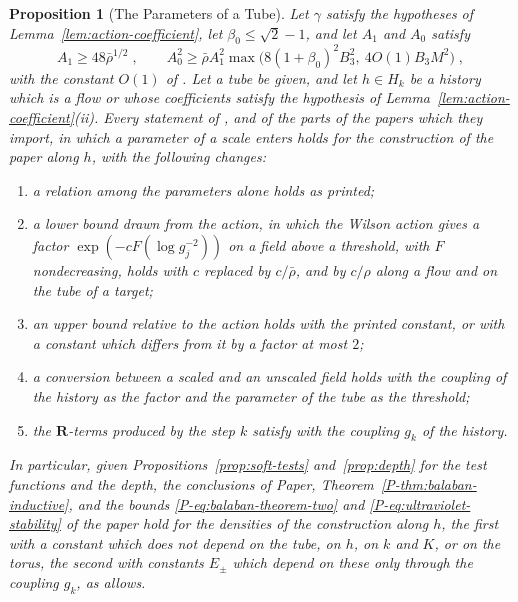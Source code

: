 \documentclass[11pt]{preprint}
\numberwithin{equation}{section}
\newtheorem{proposition}{Proposition}
\theoremstyle{definition}
\theoremstyle{remark}
\theoremstyle{plain}
\begin{document}
\begin{proposition}[The Parameters of a Tube]\label{prop:parameters}
Let $\gamma$ satisfy the hypotheses of Lemma~\ref{lem:action-coefficient}, let $\beta_0 \leq \sqrt2 - 1$, and let $A_1$ and $A_0$ satisfy
\begin{equation}\label{eq:threshold-constants}
    A_1 \geq 48\bar\rho^{1/2}\;,
    \qquad
    A_0^2 \geq \bar\rho A_1^2\max\bigl(8(1 + \beta_0)^2B_3^2,\ 4O(1)B_3M^2\bigr)\;,
\end{equation}
with the constant $O(1)$ of \cite[p.~381]{BalabanLFR2}. Let a tube be given, and let $h \in H_k$ be a history which is a flow or whose coefficients satisfy the hypothesis of Lemma~\ref{lem:action-coefficient}(ii). Every statement of \cite{BalabanCRE,BalabanLFR1,BalabanLFR2}, and of the parts of the papers which they import, in which a parameter of a scale enters holds for the construction of the paper along $h$, with the following changes:
\begin{enumerate}[label=(\alph*)]
\item a relation among the parameters alone holds as printed;
\item a lower bound drawn from the action, in which the Wilson action gives a factor $\exp(-cF(\log g_j^{-2}))$ on a field above a threshold, with $F$ nondecreasing, holds with $c$ replaced by $c/\bar\rho$, and by $c/\rho$ along a flow and on the tube of a target;
\item an upper bound relative to the action holds with the printed constant, or with a constant which differs from it by a factor at most $2$;
\item a conversion between a scaled and an unscaled field holds with the coupling of the history as the factor and the parameter of the tube as the threshold;
\item the $\mathbf R$-terms produced by the step $k$ satisfy \cite[(2.31), p.~260]{BalabanCRE} with the coupling $g_k$ of the history.
\end{enumerate}
In particular, given Propositions~\ref{prop:soft-tests} and~\ref{prop:depth} for the test functions and the depth, the conclusions of Paper, Theorem~\ref{P-thm:balaban-inductive}, and the bounds \eqref{P-eq:balaban-theorem-two} and \eqref{P-eq:ultraviolet-stability} of the paper hold for the densities of the construction along $h$, the first with a constant which does not depend on the tube, on $h$, on $k$ and $K$, or on the torus, the second with constants $E_\pm$ which depend on these only through the coupling $g_k$, as \cite[Corollary~3, p.~264]{BalabanCRE} allows.
\end{proposition}
\end{document}
